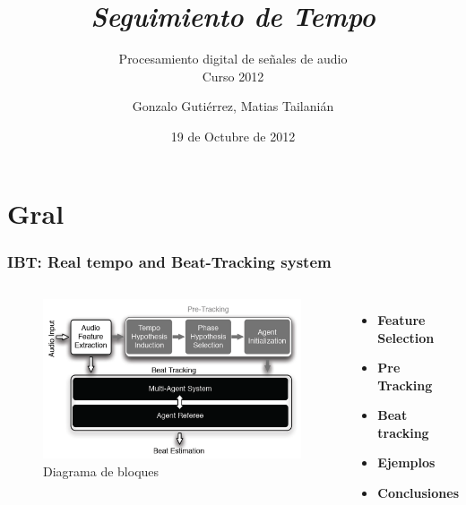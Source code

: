 \documentclass[slidestop,compress,mathserif,xcolor=svgnames,table,xcolor=dvipsnames]{beamer}
\author{Gonzalo Gutiérrez, Matias Tailanián}
\date{19 de Octubre de 2012}
\title{\textit{Seguimiento de Tempo}}
\subtitle{Procesamiento digital de señales de audio\\Curso 2012}
\newenvironment{itemize*}%
  {\begin{itemize}%
    \setlength{\topsep}{10pt}%
    \setlength{\itemsep}{0pt}%
    \setlength{\parskip}{10pt}}%
  {\end{itemize}
}
\begin{document}
\begin{frame}
  \titlepage
\end{frame}


\section{Gral}
\begin{frame}
\frametitle{IBT: Real tempo and Beat-Tracking system}

\begin{columns}

\column{2in}
\vspace{15pt}
\begin{figure}[h!]
  \begin{center}
  \includegraphics[width=1\textwidth]{./pics/bloques.png}
  \end{center}
  \vspace{-10pt}
  \caption{Diagrama de bloques}
  \label{fig:bloques}
\end{figure}

\column{2in}
\vspace{20pt}
\begin{itemize}
	\item \textbf{Feature Selection}\pause
	\item \textbf{Pre Tracking}\\\pause
	\item \textbf{Beat tracking}\pause
    \item \textbf{Ejemplos}
    \item \textbf{Conclusiones}
\end{itemize}

\end{columns}
\end{frame}
\end{document}
